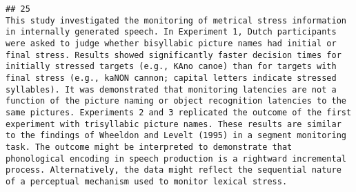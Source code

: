 \documentclass[
  english,
  man]{apa6}
\begin{document}
\begin{verbatim}
## 25                                                                                                                                                                                                                                                                                                                                                                                                                                                                                                                                                                                                                                                                                                                                                                                                                                                                                                                                                                                                                                                                                                                                                                                                                                                                                                                                                                                                                                                                                                                                                                                                                    This study investigated the monitoring of metrical stress information in internally generated speech. In Experiment 1, Dutch participants were asked to judge whether bisyllabic picture names had initial or final stress. Results showed significantly faster decision times for initially stressed targets (e.g., KAno canoe) than for targets with final stress (e.g., kaNON cannon; capital letters indicate stressed syllables). It was demonstrated that monitoring latencies are not a function of the picture naming or object recognition latencies to the same pictures. Experiments 2 and 3 replicated the outcome of the first experiment with trisyllabic picture names. These results are similar to the findings of Wheeldon and Levelt (1995) in a segment monitoring task. The outcome might be interpreted to demonstrate that phonological encoding in speech production is a rightward incremental process. Alternatively, the data might reflect the sequential nature of a perceptual mechanism used to monitor lexical stress.

\end{verbatim}
\end{document}
